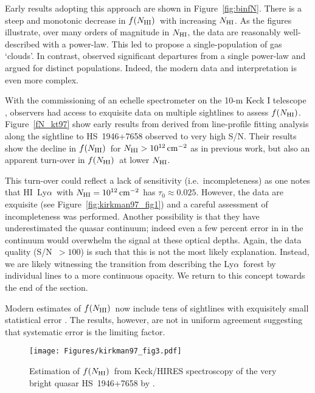 \documentclass[graybox]{svmult}
\newcommand{\HI}{H{\sc I}}
\def\lya{Ly$\alpha$}
\newcommand{\mnhi}{N_{\rm HI}}
\newcommand{\nhi}{$\mnhi$}
\def\cm#1{\, {\rm cm^{#1}}}
\def\mfnhi{f(\mnhi)}
\def\fnhi{$\mfnhi$}
\begin{document}
Early results adopting this approach are shown in 
Figure~\ref{fig:binfN}.  There is a steep and monotonic
decrease in \fnhi\ with increasing \nhi.  As the figures
illustrate, over many orders of magnitude in \nhi, the
data are reasonably  well-described with a power-law.
This led \cite{tytler87}
to propose a single-population of gas `clouds'.
In contrast, \cite{petit93} observed significant
departures from a single power-law and 
argued for distinct populations. Indeed, the
modern data and interpretation is even more complex.

With the commissioning of an echelle spectrometer on
the 10-m Keck I telescope \cite[HIRES]{vogt94}, 
observers had access to exquisite data on multiple 
sightlines to assess \fnhi.  Figure~\ref{fN_kt97}
show early results from \cite{kt97} derived from
line-profile fitting analysis along the sightline
to HS~1946+7658 observed to very high S/N.  
Their results show the decline in \fnhi\ for
$\mnhi > 10^{12} \cm{-2}$ as in previous work, but 
also an apparent turn-over in \fnhi\ at lower \nhi. 

This turn-over could reflect a lack of sensitivity 
(i.e.\ incompleteness) as one notes that \HI\ \lya\
with  $\mnhi = 10^{12} \cm{-2}$ has $\tau_0 \approx 0.025$.
However, the data are exquisite (see Figure~\ref{fig:kirkman97_fig1})
and a careful assessment of incompleteness was performed.
Another possibility is that they have underestimated the
quasar continuum; indeed even a few percent error in
in the continuum would overwhelm the signal at these
optical depths.  Again, the data quality (S/N~$>100$)
is such that this is not the most likely explanation.
Instead, we are likely witnessing the transition from
describing the \lya\ forest by individual lines to 
a more continuous opacity.  We return to this concept
towards the end of the section.

Modern estimates of \fnhi\ now include tens of sightlines
with exquisitely small statistical error \cite{rudie13,kim13}.
The results, however, are not in uniform agreement suggesting
that systematic error is the limiting factor.



%
\begin{figure}[b]
\sidecaption
\texttt{[image: Figures/kirkman97\_fig3.pdf]}
%
%
\caption{Estimation of \fnhi\ from Keck/HIRES spectroscopy of the
very bright quasar HS~1946+7658 by \cite{kt97}.
}
\label{fig:fN_kt97}       %
\end{figure}
\end{document}

